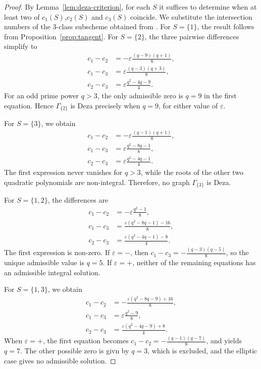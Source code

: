 \documentclass{article}
\theoremstyle{plain}
\begin{document}
\begin{proof}
By Lemma~\ref{lem:deza-criterion}, for each $S$ it suffices to determine when at least two of $c_1(S)$,$c_2(S)$ and $c_3(S)$ coincide. We substitute the intersection numbers of the $3$-class
subscheme obtained from \cite[Lemmas~4.12, 4.14 and 4.15]{AdriaensenDeBoeck2025}.
For $S=\{1\}$, the result follows from Proposition~\ref{prop:tangent}. For $S=\{2\}$, the three pairwise differences simplify to
\[
\begin{aligned}
 c_1-c_2&=-\varepsilon\frac{(q-9)(q+1)}8,\\
 c_1-c_3&= \varepsilon\frac{(q-3)(q+3)}8,\\
 c_2-c_3&= \varepsilon\frac{q^2-4q-9}{4}.
\end{aligned}
\]
For an odd prime power $q>3$, the only admissible zero is $q=9$ in the first equation. Hence $\Gamma_{\{2\}}$ is Deza precisely when $q=9$, for either value of $\varepsilon$.

For $S=\{3\}$, we obtain
\[
\begin{aligned}
 c_1-c_2&=-\varepsilon\frac{(q-1)(q+1)}8,\\
 c_1-c_3&= \varepsilon\frac{q^2-8q-1}{8},\\
 c_2-c_3&= \varepsilon\frac{q^2-4q-1}{4}.
\end{aligned}
\]
The first expression never vanishes for $q>3$, while the roots of the other two quadratic polynomials are non-integral. Therefore, no graph $\Gamma_{\{3\}}$ is Deza.

For $S=\{1,2\}$, the differences are
\[
\begin{aligned}
 c_1-c_2&=-\varepsilon\frac{q^2-1}{8},\\
 c_1-c_3&=\frac{\varepsilon(q^2-8q-1)-16}{8},\\
 c_2-c_3&=\frac{\varepsilon(q^2-4q-1)-8}{4}.
\end{aligned}
\]
The first expression is non-zero. If $\varepsilon=-$, then $c_1-c_3=-\frac{(q-3)(q-5)}8$,
so the unique admissible value is $q=5$. If $\varepsilon=+$, neither of the remaining equations has an admissible integral solution.

For $S=\{1,3\}$, we obtain
\[
\begin{aligned}
 c_1-c_2&=-\frac{\varepsilon(q^2-8q-9)+16}{8},\\
 c_1-c_3&= \varepsilon\frac{q^2-9}{8},\\
 c_2-c_3&= \frac{\varepsilon(q^2-4q-9)+8}{4}.
\end{aligned}
\]
When $\varepsilon=+$, the first equation becomes $c_1-c_2=-\frac{(q-1)(q-7)}8$, and yields $q=7$. The other possible zero is givn by $q=3$, which is excluded, and the elliptic case gives no admissible solution.


\end{proof}
\end{document}
